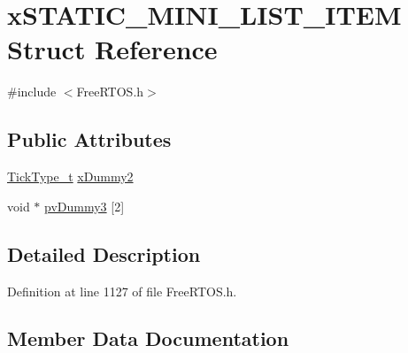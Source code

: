 \hypertarget{structx_s_t_a_t_i_c___m_i_n_i___l_i_s_t___i_t_e_m}{}\section{x\+S\+T\+A\+T\+I\+C\+\_\+\+M\+I\+N\+I\+\_\+\+L\+I\+S\+T\+\_\+\+I\+T\+EM Struct Reference}
\label{structx_s_t_a_t_i_c___m_i_n_i___l_i_s_t___i_t_e_m}


{\ttfamily \#include $<$Free\+R\+T\+O\+S.\+h$>$}

\subsection*{Public Attributes}
\begin{DoxyCompactItemize}
\item 
\hyperlink{externals_2freertos_2portable_2_g_c_c_2_a_r_m___c_m0_2portmacro_8h_aa69c48c6e902ce54f70886e6573c92a9}{Tick\+Type\+\_\+t} \hyperlink{structx_s_t_a_t_i_c___m_i_n_i___l_i_s_t___i_t_e_m_a0cbe65e7e550dc4bca38579ccac6c512}{x\+Dummy2}
\item 
void $\ast$ \hyperlink{structx_s_t_a_t_i_c___m_i_n_i___l_i_s_t___i_t_e_m_a212bc2495f1e3a225f50d3311ce00cb9}{pv\+Dummy3} \mbox{[}2\mbox{]}
\end{DoxyCompactItemize}


\subsection{Detailed Description}


Definition at line 1127 of file Free\+R\+T\+O\+S.\+h.



\subsection{Member Data Documentation}
\mbox{\label{structx_s_t_a_t_i_c___m_i_n_i___l_i_s_t___i_t_e_m_a212bc2495f1e3a225f50d3311ce00cb9}} 

